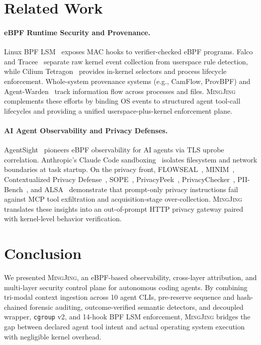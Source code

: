 \documentclass[10pt,twocolumn,letterpaper]{article}
\newcommand{\sys}{\textsc{MingJing}}
\newcommand{\code}[1]{\texttt{\small #1}}
\begin{document}
\section{Related Work}
\label{sec:related}

\paragraph{eBPF Runtime Security and Provenance.} Linux BPF LSM~\cite{bpflsm} exposes MAC hooks to verifier-checked eBPF programs. Falco~\cite{falco} and Tracee~\cite{tracee} separate raw kernel event collection from userspace rule detection, while Cilium Tetragon~\cite{tetragon} provides in-kernel selectors and process lifecycle enforcement. Whole-system provenance systems (e.g., CamFlow, ProvBPF) and Agent-Warden~\cite{agentwarden2026} track information flow across processes and files. \sys{} complements these efforts by binding OS events to structured agent tool-call lifecycles and providing a unified userspace-plus-kernel enforcement plane.

\paragraph{AI Agent Observability and Privacy Defenses.} AgentSight~\cite{agentsight2025} pioneers eBPF observability for AI agents via TLS uprobe correlation. Anthropic's Claude Code sandboxing~\cite{claudesandbox2025} isolates filesystem and network boundaries at task startup. On the privacy front, FLOWSEAL~\cite{flowseal2026}, MINIM~\cite{minim2026}, Contextualized Privacy Defense~\cite{contextualprivacy2026}, SOPE~\cite{sope2026}, PrivacyPeek~\cite{privacypeek2026}, PrivacyChecker~\cite{privacychecker2025}, PII-Bench~\cite{piibench2025}, and ALSA~\cite{alsa2025} demonstrate that prompt-only privacy instructions fail against MCP tool exfiltration and acquisition-stage over-collection. \sys{} translates these insights into an out-of-prompt HTTP privacy gateway paired with kernel-level behavior verification.

\section{Conclusion}
\label{sec:conclusion}

We presented \sys{}, an eBPF-based observability, cross-layer attribution, and multi-layer security control plane for autonomous coding agents. By combining tri-modal context ingestion across 10 agent CLIs, pre-reserve sequence and hash-chained forensic auditing, outcome-verified semantic detectors, and decoupled wrapper, \code{cgroup} v2, and 14-hook BPF LSM enforcement, \sys{} bridges the gap between declared agent tool intent and actual operating system execution with negligible kernel overhead.
\end{document}
